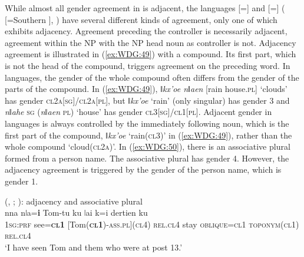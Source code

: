 \documentclass[output=collectionpaper]{langsci/langscibook}
\begin{document}
While almost all gender agreement in  is adjacent, the  languages  [=] and  [=] ( [=Southern ], ) have several different kinds of agreement, only one of which exhibits adjacency. Agreement preceding the controller is necessarily adjacent, agreement within the NP with the NP head noun as controller is not. Adjacency agreement is illustrated in (\ref{ex:WDG:49}) with a compound. Its first part, which is not the head of the compound, triggers agreement on the preceding word. In  languages, the gender of the whole compound often differs from the gender of the parts of the compound. In (\ref{ex:WDG:49}), \textit{ǁkx'oe nǁaen} [rain house.\textsc{pl}] `clouds' has gender \textsc{cl2a[sg]/cl2a[pl]}, but \textit{ǁkx'oe} `rain' (only singular) has gender 3 and \textit{nǁahe} \textsc{sg} (\textit{nǁaen} \textsc{pl}) `house' has gender \textsc{cl3[sg]/cl1[pl]}. Adjacent gender in  languages is always controlled by the immediately following noun, which is the first part of the compound, \textit{ǁkx'oe} `rain(\textsc{cl3})' in (\ref{ex:WDG:49}), rather than the whole compound `cloud(\textsc{cl2a})'. In (\ref{ex:WDG:50}), there is an associative plural formed from a person name. The associative plural has gender 4. However, the adjacency agreement is triggered by the gender of the person name, which is gender 1.

%

\ea\label{ex:WDG:50}
 (, ; \citealt{Gueldemann2006}): adjacency and associative plural\\
\gll nna	nǀa=\textbf{i}	Tom-tu	ku	ǀai	k=i	dertien	ku\\
\textsc{1sg:prf}	see=\textbf{\textsc{cl1}}	[Tom(\textbf{\textsc{cl1}})-\textsc{ass.pl](cl4)}	\textsc{rel.cl4}	stay	\textsc{oblique=cl1}	\textsc{toponym(cl1)}	\textsc{rel.cl4}\\
\glt `I have seen Tom and them who were at post 13.'\\
\z
\end{document}
